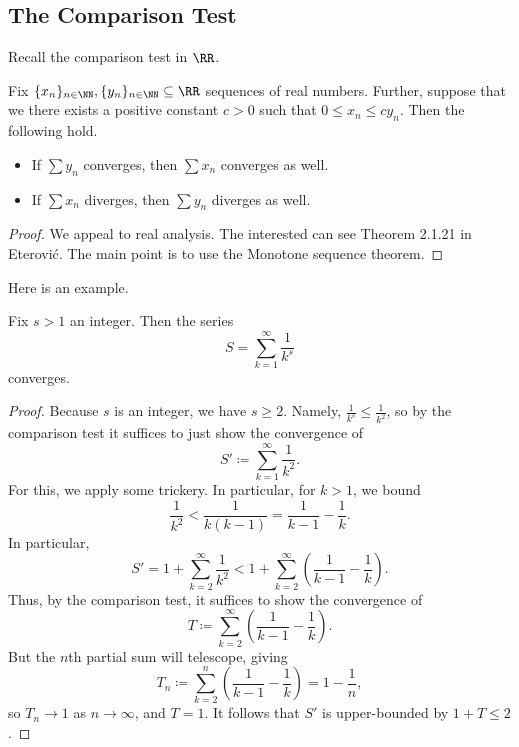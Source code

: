 \subsection{The Comparison Test}
Recall the comparison test in $\RR$.
\begin{theorem}
	Fix $\{x_n\}_{n\in\NN},\{y_n\}_{n\in\NN}\subseteq\RR$ sequences of real numbers. Further, suppose that we there exists a positive constant $c>0$ such that $0\le x_n\le cy_n$. Then the following hold.
	\begin{itemize}
		\item If $\sum y_n$ converges, then $\sum x_n$ converges as well.
		\item If $\sum x_n$ diverges, then $\sum y_n$ diverges as well.
	\end{itemize}
\end{theorem}
\begin{proof}
	We appeal to real analysis. The interested can see Theorem 2.1.21 in Eterovi\'c. The main point is to use the Monotone sequence theorem.
\end{proof}
Here is an example.
\begin{exe}
	Fix $s>1$ an integer. Then the series
	\[S=\sum_{k=1}^\infty\frac1{k^s}\]
	converges.
\end{exe}
\begin{proof}
	Because $s$ is an integer, we have $s\ge2$. Namely, $\frac1{k^s}\le\frac1{k^2}$, so by the comparison test it suffices to just show the convergence of
	\[S'\coloneqq\sum_{k=1}^\infty\frac1{k^2}.\]
	For this, we apply some trickery. In particular, for $k>1$, we bound
	\[\frac1{k^2}<\frac1{k(k-1)}=\frac1{k-1}-\frac1k.\]
	In particular,
	\[S'=1+\sum_{k=2}^\infty\frac1{k^2}<1+\sum_{k=2}^\infty\left(\frac1{k-1}-\frac1k\right).\]
	Thus, by the comparison test, it suffices to show the convergence of
	\[T\coloneqq\sum_{k=2}^\infty\left(\frac1{k-1}-\frac1k\right).\]
	But the $n$th partial sum will telescope, giving
	\[T_n\coloneqq\sum_{k=2}^n\left(\frac1{k-1}-\frac1k\right)=1-\frac1n,\]
	so $T_n\to1$ as $n\to\infty$, and $T=1$. It follows that $S'$ is upper-bounded by $1+T\le2$.
\end{proof}

